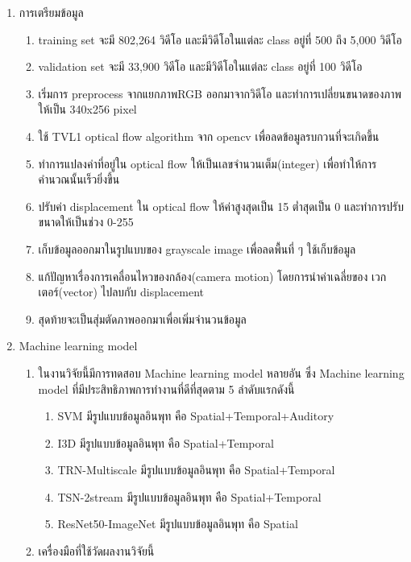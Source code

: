 \begin{enumerate}
\begin{enumerate}
\begin{enumerate}
	\end{enumerate}
\end{enumerate}
	\item การเตรียมข้อมูล
		\begin{enumerate}
			\item training set จะมี 802,264 วิดีโอ และมีวิดีโอในแต่ละ class อยู่ที่ 500 ถึง 5,000 วิดีโอ
			\item validation set จะมี 33,900 วิดีโอ และมีวิดีโอในแต่ละ class อยู่ที่ 100 วิดีโอ
			\item เริ่มการ preprocess จากแยกภาพRGB ออกมาจากวิดีโอ และทำการเปลี่ยนขนาดของภาพให้เป็น 340x256  pixel
			\item ใช้ TVL1 optical flow algorithm จาก opencv เพื่อลดข้อมูลรบกวนที่จะเกิดขึ้น
			\item ทำการแปลงค่าที่อยู่ใน optical flow ให้เป็นเลขจำนวนเต็ม(integer) เพื่อทำให้การคำนวณนั้นเร็วยิ่งขึ้น
			\item ปรับค่า displacement ใน optical flow ให้ค่าสูงสุดเป็น 15 ต่ำสุดเป็น 0 และทำการปรับขนาดให้เป็นช่วง 0-255
			\item เก็บข้อมูลออกมาในรูปแบบของ grayscale image เพื่อลดพื้นที่ ๆ ใช้เก็บข้อมูล
			\item แก้ปัญหาเรื่องการเคลื่อนไหวของกล้อง(camera motion) โดยการนำค่าเฉลี่ยของ เวกเตอร์(vector) ไปลบกับ displacement
			\item สุดท้ายจะเป็นสุ่มตัดภาพออกมาเพื่อเพิ่มจำนวนข้อมูล
		\end{enumerate}
	\item {Machine learning model}
	\begin{enumerate}
		\item ในงานวิจัยนี้มีการทดสอบ Machine learning model หลายอัน ซึ่ง Machine learning model ที่มีประสิทธิภาพการทำงานที่ดีที่สุดตาม 5 ลำดับแรกดังนี้
			\begin{enumerate}
				\item SVM				มีรูปแบบข้อมูลอินพุท คือ Spatial+Temporal+Auditory 	
				\item I3D 				มีรูปแบบข้อมูลอินพุท คือ Spatial+Temporal
				\item TRN-Multiscale		มีรูปแบบข้อมูลอินพุท คือ Spatial+Temporal
				\item TSN-2stream		มีรูปแบบข้อมูลอินพุท คือ Spatial+Temporal
				\item ResNet50-ImageNet	มีรูปแบบข้อมูลอินพุท คือ Spatial
			\end{enumerate}
		\item เครื่องมือที่ใช้วัดผลงานวิจัยนี้
			\begin{enumerate}

\end{enumerate}
\end{enumerate}
\end{enumerate}
